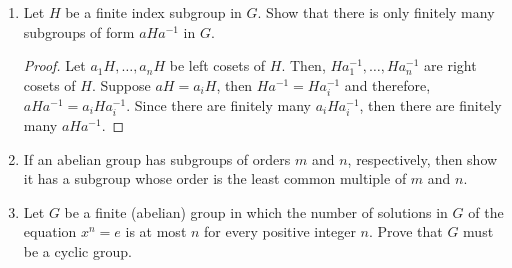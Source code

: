 \begin{enumerate}
\begin{proof}
        Therefore, \(Ha_i \cap Kb_j\) are either empty or a right coset of \(H \cap K\). Since there finitely many \(Ha_i \cap Kb_j\), there finitely many right cosets of \(H \cap K\) in \(G\). Moreover, \(\squareBracket{G:H \cap K} \leq \squareBracket{G:H} \squareBracket{G:K}\) by this construction. Note that, \(H \cap K\) is finite index in \(H\), and let \((H \cap K)c_1, \dots , (H \cap K)c_l\) be the right cosets of \(H \cap K\) in \(H\). We claim that \((H \cap K)c_ra_i\) are the right cosets of \(H \cap K\) in \(G\). By definition, for each \(x \in G\), there exists \(i\) such that \(x \in Ha_i\)and hence \(x = ha_i\) for some \(h \in H\). Similary, there exists \(r\) such that \(h \in (H \cap K)c_r\) and hence \(h = fc_r\) for some \(f \in H \cap K\). Therefore, \(x = fc_ra_i\) and \(x \in (H \cap K)c_ra_i\). Lastly, we must show that \((H \cap K)c_ra_i\) are disjoint. Consider \((H \cap K)  c_{r_1}a_{i_1}\) and \((H \cap K)c_{r_2}a_{i_2}\). Since \((H \cap K)c_{r_1}, (H \cap K)c_{r_2} \subset H\), then 
        \begin{align*}
            (H \cap K)c_{r_1}a_{i_1} = (H \cap K)  c_{r_2}a_{i_2} &\implies a_{i_1} = a_{i_2}, (H \cap K)  c_{r_1} = (H \cap K)  c_{r_2}\\
            &\implies a_{i_1} = a_{i_2}, c_{r_1} = c_{r_2}
        \end{align*}
        As a result, \(\squareBracket{G:H \cap K} = \squareBracket{G:H} \squareBracket{H:H\cap K}\).
        \end{proof}
    \item Let \(H\) be a finite index subgroup in \(G\). Show that there is only finitely many subgroups of form \(aHa^{-1}\) in \(G\).
    \begin{proof}
        Let \(a_1H, \dots, a_nH\) be left cosets of \(H\). Then, \(Ha_1^{-1}, \dots, Ha_n^{-1}\) are right cosets of \(H\). Suppose \(aH = a_iH\), then \(Ha^{-1} = Ha_i^{-1}\) and therefore, \(aHa^{-1} = a_{i} H a_{i}^{-1}\). Since there are finitely many \(a_i H a_i^{-1}\), then there are finitely many \(aHa^{-1}\).
    \end{proof}
    \item If an abelian group has subgroups of orders \(m\) and \(n\), respectively, then show it has a subgroup whose order is the least common multiple of \(m\) and \(n\).
    \item Let \(G\) be a finite (abelian) group in which the number of solutions in \(G\) of the equation \(x^n = e\) is at most \(n\) for every positive integer \(n\). Prove that \(G\) must be a cyclic group.
\end{enumerate}
